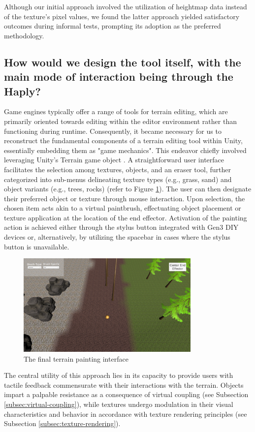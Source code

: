Although our initial approach involved the utilization of heightmap data instead of the texture's pixel values, we found the latter approach yielded satisfactory outcomes during informal tests, prompting its adoption as the preferred methodology.

\subsection{How would we design the tool itself, with the main mode of interaction being through the Haply?} \label{subsec:terrain-painting}

Game engines typically offer a range of tools for terrain editing, which are primarily oriented towards editing within the editor environment rather than functioning during runtime. Consequently, it became necessary for us to reconstruct the fundamental components of a terrain editing tool within Unity, essentially embedding them as "game mechanics". This endeavor chiefly involved leveraging Unity's Terrain game object \cite{unityterrain}. A straightforward user interface facilitates the selection among textures, objects, and an eraser tool, further categorized into sub-menus delineating texture types (e.g., grass, sand) and object variants (e.g., trees, rocks) (refer to Figure \ref{fig:terrain-painting}). The user can then designate their preferred object or texture through mouse interaction. Upon selection, the chosen item acts akin to a virtual paintbrush, effectuating object placement or texture application at the location of the end effector. Activation of the painting action is achieved either through the stylus button integrated with Gen3 DIY devices or, alternatively, by utilizing the spacebar in cases where the stylus button is unavailable.

\begin{figure}[htbp]
    \centering
    \includegraphics[width=0.8\textwidth]{images/approach-terrain-painter.png} 
    \caption{The final terrain painting interface}
    \label{fig:terrain-painting}
\end{figure}

The central utility of this approach lies in its capacity to provide users with tactile feedback commensurate with their interactions with the terrain. Objects impart a palpable resistance as a consequence of virtual coupling (see Subsection \ref{subsec:virtual-coupling}), while textures undergo modulation in their visual characteristics and behavior in accordance with texture rendering principles (see Subsection \ref{subsec:texture-rendering}).
